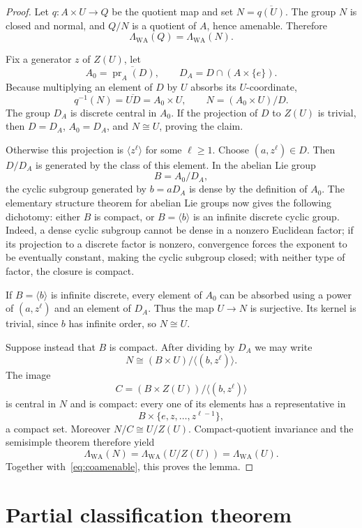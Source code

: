 \documentclass[11pt]{article}
\newcommand{\WA}{\mathrm{WA}}
\begin{document}
\begin{proof}
Let $q:A\times U\to Q$ be the quotient map and set
$N=\overline{q(U)}$.  The group $N$ is closed and normal, and $Q/N$ is a
quotient of $A$, hence amenable.  Therefore
\begin{equation}\label{eq:coamenable}
 \Lambda_{\WA}(Q)=\Lambda_{\WA}(N).
\end{equation}

Fix a generator $z$ of $Z(U)$, let
\[
 A_0=\overline{\operatorname{pr}_A(D)},
 \qquad D_A=D\cap(A\times\{e\}).
\]
Because multiplying an element of $D$ by $U$ absorbs its $U$-coordinate,
\[
 q^{-1}(N)=\overline{UD}=A_0\times U,
 \qquad N=(A_0\times U)/D.
\]
The group $D_A$ is discrete central in $A_0$.  If the projection of $D$ to
$Z(U)$ is trivial, then $D=D_A$, $A_0=D_A$, and $N\cong U$, proving the
claim.

Otherwise this projection is $\langle z^\ell\rangle$ for some $\ell\geq1$.
Choose $(a,z^\ell)\in D$.  Then $D/D_A$ is generated by the class of this
element.  In the abelian Lie group
\[
 B=A_0/D_A,
\]
the cyclic subgroup generated by $b=aD_A$ is dense by the definition of
$A_0$.  The elementary structure theorem for abelian Lie groups now gives
the following dichotomy: either $B$ is compact, or $B=\langle b\rangle$ is
an infinite discrete cyclic group.  Indeed, a dense cyclic subgroup cannot
be dense in a nonzero Euclidean factor; if its projection to a discrete
factor is nonzero, convergence forces the exponent to be eventually
constant, making the cyclic subgroup closed; with neither type of factor,
the closure is compact.

If $B=\langle b\rangle$ is infinite discrete, every element of $A_0$ can be
absorbed using a power of $(a,z^\ell)$ and an element of $D_A$.  Thus the
map $U\to N$ is surjective.  Its kernel is trivial, since $b$ has infinite
order, so $N\cong U$.

Suppose instead that $B$ is compact.  After dividing by $D_A$ we may write
\[
 N\cong (B\times U)/\langle(b,z^\ell)\rangle.
\]
The image
\[
 C=(B\times Z(U))/\langle(b,z^\ell)\rangle
\]
is central in $N$ and is compact: every one of its elements has a
representative in
\[
 B\times\{e,z,\ldots,z^{\ell-1}\},
\]
a compact set.  Moreover $N/C\cong U/Z(U)$.  Compact-quotient invariance and
the semisimple theorem therefore yield
\[
 \Lambda_{\WA}(N)=\Lambda_{\WA}(U/Z(U))
 =\Lambda_{\WA}(U).
\]
Together with~\eqref{eq:coamenable}, this proves the lemma.
\end{proof}

\section{Partial classification theorem}
\end{document}
